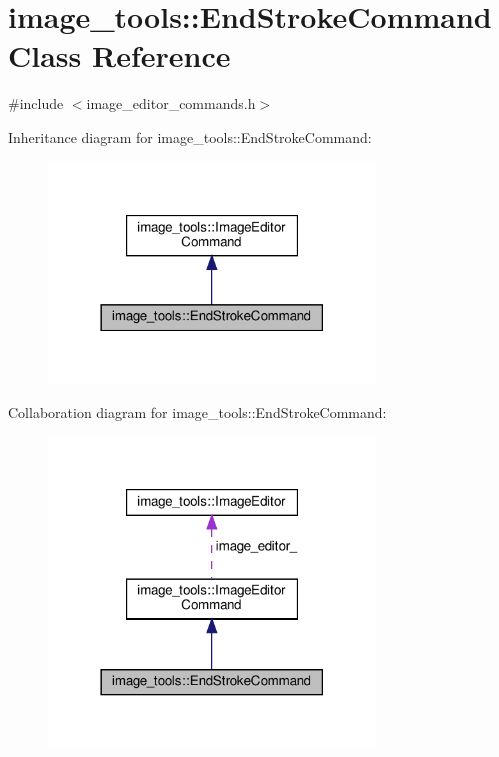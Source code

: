 \hypertarget{classimage__tools_1_1EndStrokeCommand}{}\section{image\+\_\+tools\+:\+:End\+Stroke\+Command Class Reference}
\label{classimage__tools_1_1EndStrokeCommand}


{\ttfamily \#include $<$image\+\_\+editor\+\_\+commands.\+h$>$}



Inheritance diagram for image\+\_\+tools\+:\+:End\+Stroke\+Command\+:
\nopagebreak
\begin{figure}[H]
\begin{center}
\leavevmode
\includegraphics[width=246pt]{classimage__tools_1_1EndStrokeCommand__inherit__graph}
\end{center}
\end{figure}


Collaboration diagram for image\+\_\+tools\+:\+:End\+Stroke\+Command\+:
\nopagebreak
\begin{figure}[H]
\begin{center}
\leavevmode
\includegraphics[width=246pt]{classimage__tools_1_1EndStrokeCommand__coll__graph}
\end{center}
\end{figure}
